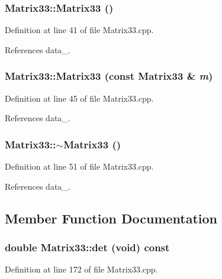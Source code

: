 \subsubsection[{Matrix33}]{\setlength{\rightskip}{0pt plus 5cm}Matrix33::Matrix33 ()}\label{classMatrix33_a70acb6647b172d017cc4265a29a7d263}


Definition at line 41 of file Matrix33.cpp.



References data\_\-.

\subsubsection[{Matrix33}]{\setlength{\rightskip}{0pt plus 5cm}Matrix33::Matrix33 (const {\bf Matrix33} \& {\em m})}\label{classMatrix33_a1eafb2bf90a35223f076b2d404edc99e}


Definition at line 45 of file Matrix33.cpp.



References data\_\-.

\subsubsection[{$\sim$Matrix33}]{\setlength{\rightskip}{0pt plus 5cm}Matrix33::$\sim$Matrix33 ()}\label{classMatrix33_a5b1c63abd514549038c8156027d6c490}


Definition at line 51 of file Matrix33.cpp.



References data\_\-.



\subsection{Member Function Documentation}
\subsubsection[{det}]{\setlength{\rightskip}{0pt plus 5cm}double Matrix33::det (void) const}\label{classMatrix33_ad1bf7e69a69d1643a014cfdaa41e1493}


Definition at line 172 of file Matrix33.cpp.



